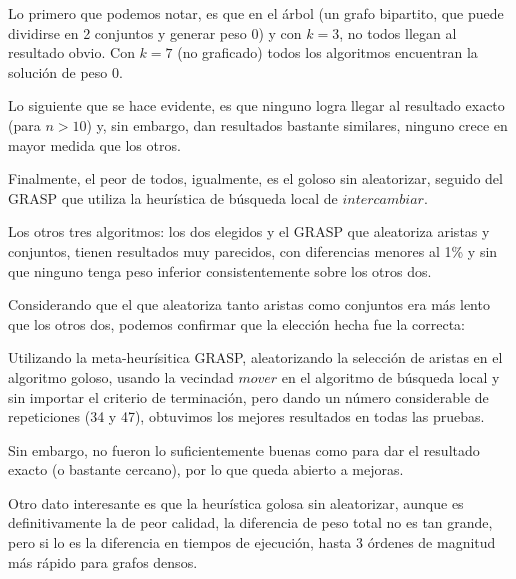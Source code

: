 \vspace*{0.5cm}

Lo primero que podemos notar, es que en el árbol (un grafo bipartito, que puede
dividirse en 2 conjuntos y generar peso 0) y con $k = 3$, no todos llegan al
resultado obvio. Con $k = 7$ (no graficado) todos los algoritmos encuentran la
solución de peso 0.

Lo siguiente que se hace evidente, es que ninguno logra llegar al resultado
exacto (para $n > 10$) y, sin embargo, dan resultados bastante similares,
ninguno crece en mayor medida que los otros.

Finalmente, el peor de todos, igualmente, es el goloso sin aleatorizar,
seguido del GRASP que utiliza la heurística de búsqueda local de $intercambiar$.

Los otros tres algoritmos: los dos elegidos y el GRASP que aleatoriza aristas y
conjuntos, tienen resultados muy parecidos, con diferencias menores al 1\% y sin
que ninguno tenga peso inferior consistentemente sobre los otros dos.

Considerando que el que aleatoriza tanto aristas como conjuntos era más lento
que los otros dos, podemos confirmar que la elección hecha fue la correcta:

Utilizando la meta-heurísitica GRASP, aleatorizando la selección de aristas en
el algoritmo goloso, usando la vecindad $mover$ en el algoritmo de búsqueda
local y sin importar el criterio de terminación, pero dando un número
considerable de repeticiones (34 y 47), obtuvimos los mejores resultados en
todas las pruebas.

Sin embargo, no fueron lo suficientemente buenas como para dar el resultado
exacto (o bastante cercano), por lo que queda abierto a mejoras.

Otro dato interesante es que la heurística golosa sin aleatorizar, aunque es
definitivamente la de peor calidad, la diferencia de peso total no es tan grande,
pero si lo es la diferencia en tiempos de ejecución, hasta 3 órdenes de magnitud
más rápido para grafos densos.


